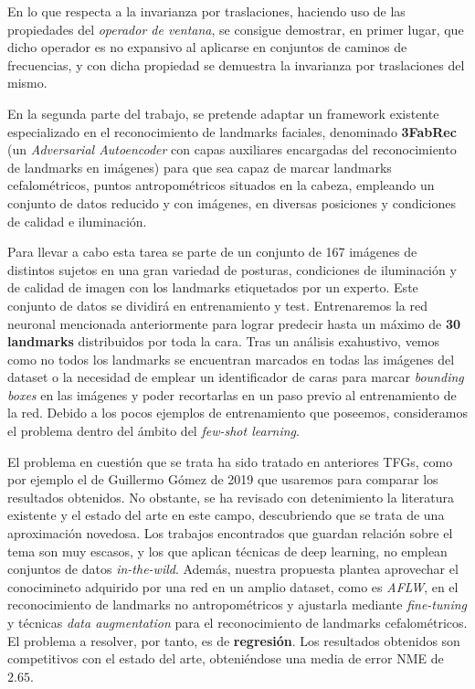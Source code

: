 \medskip

\noindent En lo que respecta a la invarianza por traslaciones, haciendo uso de las propiedades del \textit{operador de ventana}, se consigue demostrar, en primer lugar, que dicho operador es no expansivo al aplicarse en conjuntos de caminos de frecuencias, y con dicha propiedad se demuestra la invarianza por traslaciones del mismo.

\medskip

\noindent En la segunda parte del trabajo, se pretende adaptar un framework existente especializado en el reconocimiento de landmarks faciales, denominado \textbf{3FabRec} (un \textit{Adversarial Autoencoder} con capas auxiliares encargadas del reconocimiento de landmarks en imágenes) para que sea capaz de marcar landmarks cefalométricos, puntos antropométricos situados en la cabeza, empleando un conjunto de datos reducido y con imágenes, en diversas posiciones y condiciones de calidad e iluminación.

\medskip

\noindent Para llevar a cabo esta tarea se parte de un conjunto de 167 imágenes de distintos sujetos en una gran variedad de posturas, condiciones de iluminación y de calidad de imagen con los landmarks etiquetados por un experto. Este conjunto de datos se dividirá en entrenamiento y test. Entrenaremos la red neuronal mencionada anteriormente para lograr predecir hasta un máximo de \textbf{30 landmarks} distribuidos por toda la cara. Tras un análisis exahustivo, vemos como no todos los landmarks se encuentran marcados en todas las imágenes del dataset o la necesidad de emplear un identificador de caras para marcar \textit{bounding boxes} en las imágenes y poder recortarlas en un paso previo al entrenamiento de la red. Debido a los pocos ejemplos de entrenamiento que poseemos, consideramos el problema dentro del ámbito del \textit{few-shot learning}.

\medskip

\noindent El problema en cuestión que se trata ha sido tratado en anteriores TFGs, como por ejemplo el de Guillermo Gómez de 2019 que usaremos para comparar los resultados obtenidos. No obstante, se ha revisado con detenimiento la literatura existente y el estado del arte en este campo, descubriendo que se trata de una aproximación novedosa. Los trabajos encontrados que guardan relación sobre el tema son muy escasos, y los que aplican técnicas de deep learning, no emplean conjuntos de datos \textit{in-the-wild}. Además, nuestra propuesta plantea aprovechar el conocimineto adquirido por una red en un amplio dataset, como es \textit{AFLW}, en el reconocimiento de landmarks no antropométricos y ajustarla mediante \textit{fine-tuning}  y técnicas \textit{data augmentation}  para el reconocimiento de landmarks cefalométricos. El problema a resolver, por tanto, es de \textbf{regresión}. Los resultados obtenidos son competitivos con el estado del arte, obteniéndose una media de error NME de $2.65$.

